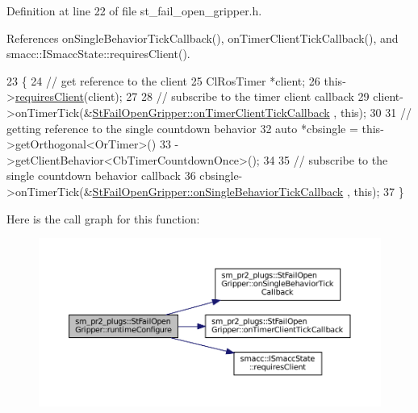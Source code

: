 Definition at line 22 of file st\+\_\+fail\+\_\+open\+\_\+gripper.\+h.



References on\+Single\+Behavior\+Tick\+Callback(), on\+Timer\+Client\+Tick\+Callback(), and smacc\+::\+I\+Smacc\+State\+::requires\+Client().


\begin{DoxyCode}
23     \{
24         \textcolor{comment}{// get reference to the client}
25         ClRosTimer *client;
26         this->\hyperlink{classsmacc_1_1ISmaccState_a7f95c9f0a6ea2d6f18d1aec0519de4ac}{requiresClient}(client);
27 
28         \textcolor{comment}{// subscribe to the timer client callback}
29         client->onTimerTick(&\hyperlink{structsm__pr2__plugs_1_1StFailOpenGripper_a61f887a4b8a6884466df6bdf96af3936}{StFailOpenGripper::onTimerClientTickCallback}
      , \textcolor{keyword}{this});
30 
31         \textcolor{comment}{// getting reference to the single countdown behavior}
32         \textcolor{keyword}{auto} *cbsingle = this->getOrthogonal<OrTimer>()
33                              ->getClientBehavior<CbTimerCountdownOnce>();
34 
35         \textcolor{comment}{// subscribe to the single countdown behavior callback}
36         cbsingle->onTimerTick(&\hyperlink{structsm__pr2__plugs_1_1StFailOpenGripper_a93912d044e4fe53795fc07174ae3f830}{StFailOpenGripper::onSingleBehaviorTickCallback}
      , \textcolor{keyword}{this});
37     \}
\end{DoxyCode}
Here is the call graph for this function\+:
\nopagebreak
\begin{figure}[H]
\begin{center}
\leavevmode
\includegraphics[width=350pt]{structsm__pr2__plugs_1_1StFailOpenGripper_a9972024358d52891ff6ff0282f1abfba_cgraph}
\end{center}
\end{figure}
\mbox{\label{structsm__pr2__plugs_1_1StFailOpenGripper_aec94e3e8bea31f8eb3f37c11e57fd5d1}} 
